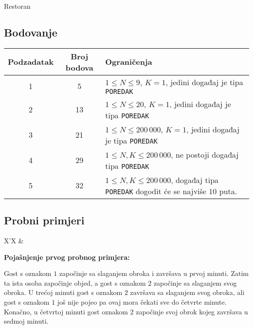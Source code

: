 \begin{statement}[
  problempoints=100,
  timelimit=1 sekunda,
  memorylimit=512 MiB,
]{Restoran}
\subsection*{Bodovanje}
{\renewcommand{\arraystretch}{1.4}
  \setlength{\tabcolsep}{6pt}
  \begin{tabular}{ccl}
 Podzadatak & Broj bodova & Ograničenja \\ \midrule
  1 & 5 & $1 \le N \le 9$, $K = 1$, jedini događaj je tipa \texttt{POREDAK} \\
  2 & 13 & $1 \le N \le 20$, $K = 1$, jedini događaj je tipa \texttt{POREDAK} \\
  3 & 21 & $1 \le N \le 200\,000$, $K = 1$, jedini događaj je tipa \texttt{POREDAK} \\
  4 & 29 & $1 \le N, K \le 200\,000$, ne postoji događaj tipa \texttt{POREDAK} \\
  5 & 32 & $1 \le N, K \le 200\,000$, događaj tipa \texttt{POREDAK} dogodit će se najviše $10$ puta.  \\
\end{tabular}}

\subsection*{Probni primjeri}
\begin{tabularx}{\textwidth}{X'X}
 &
\end{tabularx}

\textbf{Pojašnjenje prvog probnog primjera:}

Gost s oznakom $1$ započinje sa slaganjem obroka i završava
u prvoj minuti. Zatim ta ista osoba započinje objed, a gost s oznakom $2$
započinje sa slaganjem svog obroka. U trećoj minuti gost s oznakom $2$ završava
sa slaganjem svog obroka, ali gost s oznakom $1$ još nije pojeo pa ovaj mora
čekati sve do četvrte minute. Konačno, u četvrtoj minuti gost oznakom $2$
započinje svoj obrok kojeg završava u sedmoj minuti.


\end{statement}

